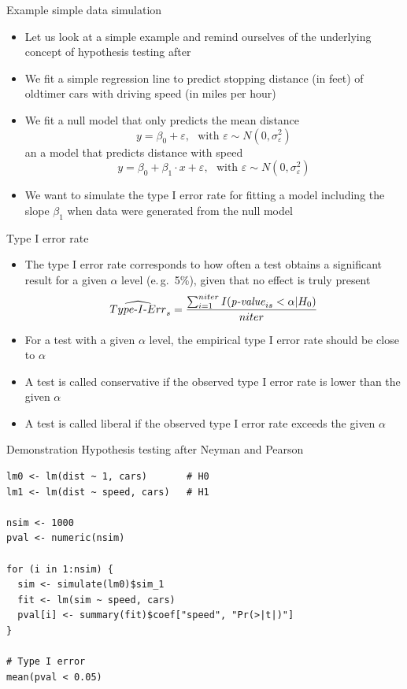 \documentclass[aspectratio=169]{beamer}
\begin{document}
\begin{frame}{Example simple data simulation}
  \begin{itemize}
    \item Let us look at a simple example and remind ourselves of the underlying
      concept of hypothesis testing after \citet{NeymanPearson33}
    \item We fit a simple regression line to predict stopping distance (in feet)
      of oldtimer cars with driving speed (in miles per hour)
    \item We fit a null model that only predicts the mean distance
      \[
        y = \beta_0 + \varepsilon, ~~~\text{with } \varepsilon \sim N(0,
        \sigma^2_{\varepsilon})
      \]
      an a model that predicts distance with speed
      \[
        y = \beta_0 + \beta_1 \cdot x + \varepsilon, ~~~\text{with } \varepsilon
        \sim N(0, \sigma^2_{\varepsilon})
      \]
    \item We want to simulate the type I error rate for fitting a model
      including the slope $\beta_1$ when data were generated from the null model
  \end{itemize}
\end{frame}

\begin{frame}{Type I error rate}
\begin{itemize}
  \item The type I error rate corresponds to how often a test obtains a
    significant result for a given $\alpha$ level (e.\,g.~5\%), given that no
    effect is truly present
\vspace{0.4cm}
\begin{equation*}
\widehat{\text{$Type$-$I$-$Err$}}_s = \frac{\sum_{i = 1}^{niter} I(\mbox{\emph{p-value}}_{is} < \alpha | H_0)}{niter}
\end{equation*}
  \item For a test with a given $\alpha$ level, the empirical type I error rate
    should be close to $\alpha$
  \item A test is called conservative if the observed type I error rate is lower
    than the given $\alpha$
  \item A test is called liberal if the observed type I error rate exceeds the
    given $\alpha$
\end{itemize}
\end{frame}

\begin{frame}[fragile]{Demonstration}
  {Hypothesis testing after Neyman and Pearson}
\begin{lstlisting}
lm0 <- lm(dist ~ 1, cars)       # H0
lm1 <- lm(dist ~ speed, cars)   # H1

nsim <- 1000
pval <- numeric(nsim)

for (i in 1:nsim) {
  sim <- simulate(lm0)$sim_1
  fit <- lm(sim ~ speed, cars)
  pval[i] <- summary(fit)$coef["speed", "Pr(>|t|)"]
}

# Type I error
mean(pval < 0.05)
\end{lstlisting}
\end{frame}
\end{document}
